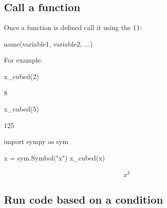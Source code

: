 \subsection{Call a function}
\label{\detokenize{tools-for-mathematics/06-probability/how/main:call-a-function}}

Once a function is defined call it using the \texttt{()}:


\begin{pyin}
name(variable1, variable2, ...)
\end{pyin}



For example:




\begin{pyin}
x_cubed(2)
\end{pyin}





\begin{raw}
8
\end{raw}







\begin{pyin}
x_cubed(5)
\end{pyin}





\begin{raw}
125
\end{raw}







\begin{pyin}
import sympy as sym

x = sym.Symbol("x")
x_cubed(x)
\end{pyin}




\begin{equation*}
\begin{split}\displaystyle x^{3}\end{split}
\end{equation*}




\subsection{Run code based on a condition}
\label{\detokenize{tools-for-mathematics/06-probability/how/main:conditional-running-of-code}}

